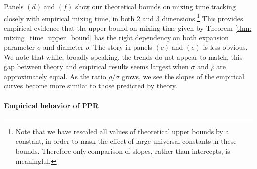 \documentclass{article}
\newcommand{\1}{\mathbf{1}}
\newcommand{\ppr}{{\sc PPR}}
\theoremstyle{aldenthm}
\theoremstyle{aldenrmrk}
\begin{document}
Panels $(d)$ and $(f)$ show our theoretical bounds on mixing time tracking closely with empirical mixing time, in both 2 and 3 dimensions.\footnote{Note that we have rescaled all values of theoretical upper bounds by a constant, in order to mask the effect of large universal constants in these bounds. Therefore only comparison of slopes, rather than intercepts, is meaningful.} This provides empirical evidence that the upper bound on mixing time given by Theorem \ref{thm: mixing_time_upper_bound} has the right dependency on both expansion parameter $\sigma$ and diameter $\rho$. The story in panels $(c)$ and $(e)$ is less obvious. We note that while, broadly speaking, the trends do not appear to match, this gap between theory and empirical results seems largest when $\sigma $ and $\rho$ are approximately equal. As the ratio $\rho/\sigma$ grows, we see the slopes of the empirical curves become more similar to those predicted by theory.

\paragraph{Empirical behavior of \ppr}
\end{document}

